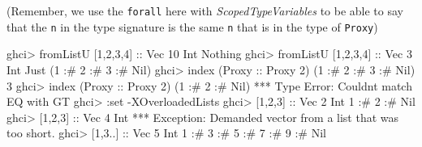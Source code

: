 \documentclass[]{article}
\newenvironment{Shaded}{}{}
\newcommand{\DataTypeTok}[1]{\textcolor[rgb]{0.56,0.13,0.00}{#1}}
\newcommand{\DecValTok}[1]{\textcolor[rgb]{0.25,0.63,0.44}{#1}}
\newcommand{\FunctionTok}[1]{\textcolor[rgb]{0.02,0.16,0.49}{#1}}
\newcommand{\NormalTok}[1]{#1}
\newcommand{\OperatorTok}[1]{\textcolor[rgb]{0.40,0.40,0.40}{#1}}
\newcommand{\OtherTok}[1]{\textcolor[rgb]{0.00,0.44,0.13}{#1}}
\begin{document}
(Remember, we use the \texttt{forall} here with \emph{ScopedTypeVariables} to be
able to say that the \texttt{n} in the type signature is the same \texttt{n}
that is in the type of \texttt{Proxy})

\begin{Shaded}
\begin{Highlighting}[]
\NormalTok{ghci}\OperatorTok{\textgreater{}}\NormalTok{ fromListU [}\DecValTok{1}\NormalTok{,}\DecValTok{2}\NormalTok{,}\DecValTok{3}\NormalTok{,}\DecValTok{4}\NormalTok{]}\OtherTok{ ::} \DataTypeTok{Vec} \DecValTok{10} \DataTypeTok{Int}
\DataTypeTok{Nothing}
\NormalTok{ghci}\OperatorTok{\textgreater{}}\NormalTok{ fromListU [}\DecValTok{1}\NormalTok{,}\DecValTok{2}\NormalTok{,}\DecValTok{3}\NormalTok{,}\DecValTok{4}\NormalTok{]}\OtherTok{ ::} \DataTypeTok{Vec} \DecValTok{3} \DataTypeTok{Int}
\DataTypeTok{Just}\NormalTok{ (}\DecValTok{1} \OperatorTok{:\#} \DecValTok{2} \OperatorTok{:\#} \DecValTok{3} \OperatorTok{:\#} \DataTypeTok{Nil}\NormalTok{)}
\NormalTok{ghci}\OperatorTok{\textgreater{}} \FunctionTok{index}\NormalTok{ (}\DataTypeTok{Proxy}\OtherTok{ ::} \DataTypeTok{Proxy} \DecValTok{2}\NormalTok{) (}\DecValTok{1} \OperatorTok{:\#} \DecValTok{2} \OperatorTok{:\#} \DecValTok{3} \OperatorTok{:\#} \DataTypeTok{Nil}\NormalTok{)}
\DecValTok{3}
\NormalTok{ghci}\OperatorTok{\textgreater{}} \FunctionTok{index}\NormalTok{ (}\DataTypeTok{Proxy}\OtherTok{ ::} \DataTypeTok{Proxy} \DecValTok{2}\NormalTok{) (}\DecValTok{1} \OperatorTok{:\#} \DecValTok{2} \OperatorTok{:\#} \DataTypeTok{Nil}\NormalTok{)}
\OperatorTok{***} \DataTypeTok{Type} \DataTypeTok{Error}\OperatorTok{:} \DataTypeTok{Couldn\textquotesingle{}t}\NormalTok{ match }\DataTypeTok{\textquotesingle{}EQ}\NormalTok{ with }\DataTypeTok{\textquotesingle{}GT}
\NormalTok{ghci}\OperatorTok{\textgreater{}} \OperatorTok{:}\NormalTok{set }\OperatorTok{{-}}\DataTypeTok{XOverloadedLists}
\NormalTok{ghci}\OperatorTok{\textgreater{}}\NormalTok{ [}\DecValTok{1}\NormalTok{,}\DecValTok{2}\NormalTok{,}\DecValTok{3}\NormalTok{]}\OtherTok{ ::} \DataTypeTok{Vec} \DecValTok{2} \DataTypeTok{Int}
\DecValTok{1} \OperatorTok{:\#} \DecValTok{2} \OperatorTok{:\#} \DataTypeTok{Nil}
\NormalTok{ghci}\OperatorTok{\textgreater{}}\NormalTok{ [}\DecValTok{1}\NormalTok{,}\DecValTok{2}\NormalTok{,}\DecValTok{3}\NormalTok{]}\OtherTok{ ::} \DataTypeTok{Vec} \DecValTok{4} \DataTypeTok{Int}
\OperatorTok{***} \DataTypeTok{Exception}\OperatorTok{:} \DataTypeTok{Demanded}\NormalTok{ vector from a list that was too short}\OperatorTok{.}
\NormalTok{ghci}\OperatorTok{\textgreater{}}\NormalTok{ [}\DecValTok{1}\NormalTok{,}\DecValTok{3}\OperatorTok{..}\NormalTok{]}\OtherTok{ ::} \DataTypeTok{Vec} \DecValTok{5} \DataTypeTok{Int}
\DecValTok{1} \OperatorTok{:\#} \DecValTok{3} \OperatorTok{:\#} \DecValTok{5} \OperatorTok{:\#} \DecValTok{7} \OperatorTok{:\#} \DecValTok{9} \OperatorTok{:\#} \DataTypeTok{Nil}
\end{Highlighting}
\end{Shaded}
\end{document}

